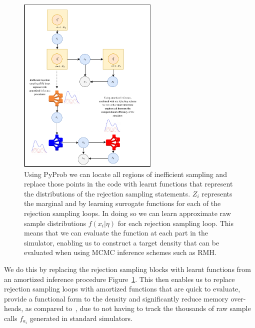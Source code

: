 \documentclass{article}
\begin{document}
\begin{figure}
  \includegraphics[width=0.6\textwidth, height=0.6\textheight,keepaspectratio]{amoritized_rejection.pdf}
    \caption{Using PyProb we can locate all regions of inefficient sampling 
    and replace those points in the code with learnt functions that represent
    the distributions of the rejection sampling statements. $Z_{i}$ represents the marginal and 
    by learning surrogate functions for each of the rejection sampling loops.
    In doing so we can learn approximate raw sample distributions $f(x_{i} | \eta)$ for each
    rejection sampling loop. This means that we can evaluate the function at each part in the simulator, enabling
    us to construct a target density that can be evaluated when using MCMC inference schemes such as RMH.}
    \label{fig:amortized_sampling}
\end{figure}


We do this by replacing the rejection sampling blocks with 
learnt functions from an amortized inference procedure Figure~\ref{fig:amortized_sampling}.
This then enables us to replace rejection sampling loops with amortized functions that 
are quick to evaluate, provide a functional form to the density and significantly reduce 
memory over-heads, as compared to~\cite{baydin2018efficient}, due to not having to track the 
thousands of raw sample calls $f_{a_i}$ generated in standard simulators. 
\end{document}
